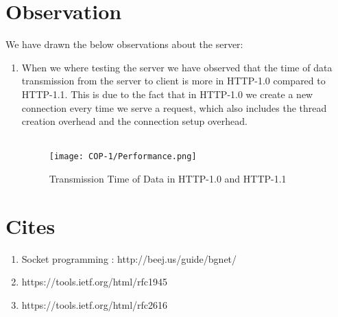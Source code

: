 \documentclass[a4paper]{article}
\begin{document}
\section{Observation}
We have drawn the below observations about the server:
  \begin{enumerate}
      \item When we where testing the server we have observed that the time of data transmission from the server to client is more in HTTP-1.0 compared to HTTP-1.1. This is due to the fact that in HTTP-1.0 we create a new connection every time we serve a request, which also includes the thread creation overhead and the connection setup overhead.\\ \\
      \begin{figure}[htp]
         \centering
             \texttt{[image: COP-1/Performance.png]}
             \caption{Transmission Time of Data in HTTP-1.0 and HTTP-1.1}
             \label{fig:benchmaking}
      \end{figure}
  \end{enumerate}
  \section{Cites}
    \begin{enumerate}
        \item Socket programming : http://beej.us/guide/bgnet/
        \item https://tools.ietf.org/html/rfc1945
        \item https://tools.ietf.org/html/rfc2616
    \end{enumerate}
\end{document}
